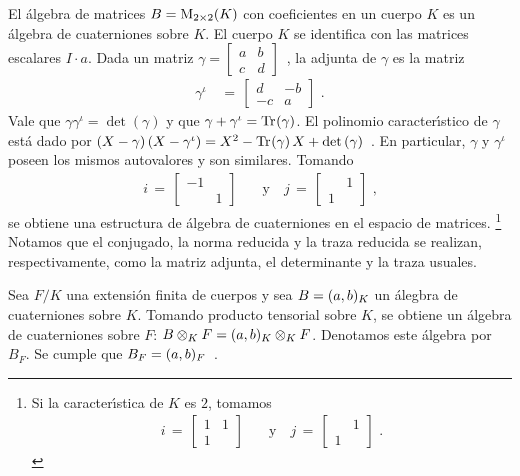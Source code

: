 \begin{ejemploMatrices}\label{ejemplo:matrices}
	El \'{a}lgebra de matrices $B=\MM_{2\times 2}(K)$ con coeficientes en
	un cuerpo $K$ es un \'{a}lgebra de cuaterniones sobre $K$. El cuerpo
	$K$ se identifica con las matrices escalares $I\cdot a$. Dada un matriz
	\begin{math}
		\gamma=\begin{bmatrix} a & b \\ c & d \end{bmatrix}
	\end{math}~,
	la adjunta de $\gamma$ es la matriz
	\begin{align*}
		\gamma^\iota & \,=\,
			\begin{bmatrix} d & -b \\
			-c & a \end{bmatrix}
		\text{ .}
	\end{align*}
	Vale que $\gamma\gamma^\iota=\det(\gamma)$ y que
	$\gamma+\gamma^\iota=\traza(\gamma)$. El polinomio caracter\'{\i}stico
	de $\gamma$ est\'{a} dado por
	\begin{math}
		(X-\gamma)\,(X-\gamma^\iota)=
			X^{2}-\traza(\gamma)\,X+\det(\gamma)
	\end{math}~. En particular, $\gamma$ y $\gamma^\iota$ poseen los mismos
	autovalores y son similares. Tomando
	\begin{align*}
		i\,=\,\begin{bmatrix} -1 & \\ & 1 \end{bmatrix} &
			\quad\text{y}\quad
		j \,=\,\begin{bmatrix} & 1 \\ 1 & \end{bmatrix}
		\text{ ,}
	\end{align*}
	se obtiene una estructura de \'{a}lgebra de cuaterniones en el espacio
	de matrices.%
	\footnote{
		Si la caracter\'{\i}stica de $K$ es $2$, tomamos
		\begin{align*}
			i\,=\,\begin{bmatrix} 1 & 1 \\ 1 & \end{bmatrix}
				& \quad\text{y}\quad
			j\,=\,\begin{bmatrix} & 1 \\ 1 & \end{bmatrix}
			\text{ .}
		\end{align*}
	}
	Notamos que el conjugado, la norma reducida y la traza reducida se
	realizan, respectivamente, como la matriz adjunta, el determinante y la
	traza usuales.
\end{ejemploMatrices}

Sea $F/K$ una extensi\'{o}n finita de cuerpos y sea $B=\varquatalg[K]{a,b}$ un
\'{a}legbra de cuaterniones sobre $K$. Tomando producto tensorial sobre $K$, se
obtiene un \'{a}lgebra de cuaterniones sobre $F$:
$B\tensor[K]F=\varquatalg[K]{a,b}\otimes_{K}F$. Denotamos este \'{a}lgebra por
$B_{F}$. Se cumple que
\begin{math}
	B_{F}=\varquatalg[F]{a,b}
\end{math}~.
